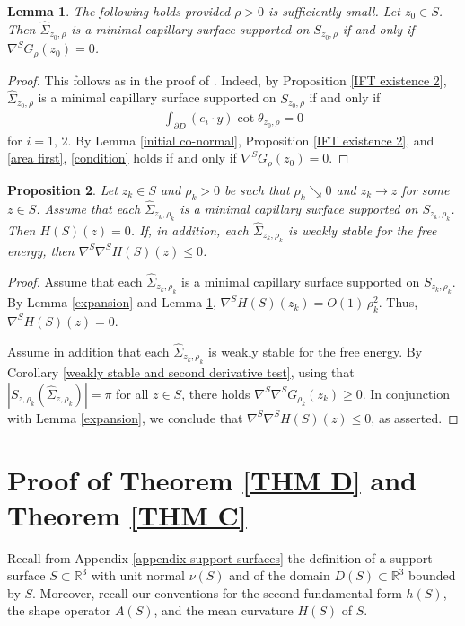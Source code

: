 \documentclass[11pt]{amsart}
\newtheorem{prop}{Proposition}
\newtheorem{lem}[prop]{Lemma}
\begin{document}
\begin{lem} \label{LS reduction}
The following holds provided  $\rho>0$ is sufficiently small. Let $z_0\in S$. Then
	$\hat \Sigma_{z_0,\rho}$ is a minimal capillary surface supported on $S_{z_0,\rho}$ if and only if $\nabla^S G_{\rho}(z_0)=0$. 
\end{lem}
\begin{proof}
This follows as in the proof of \cite[Lemma 19]{cmc}. Indeed,  by Proposition \ref{IFT existence 2}, $\hat \Sigma_{z_0,\rho}$ is a minimal capillary surface supported on $S_{z_0,\rho}$ if and only if
\begin{align} \label{condition}  
\int_{\partial D}(e_i\cdot y)\cot\theta_{z_0,\rho}=0
\end{align} 
for $i=1,\,2$. By Lemma \ref{initial co-normal}, Proposition \ref{IFT existence 2}, and \eqref{area first},  \eqref{condition} holds if and only if $\nabla^SG_\rho(z_0)=0$.

\end{proof}

\begin{prop} \label{mean curvature consequences}
Let $z_k\in S$ and $\rho_k>0$ be such that $\rho_k\searrow 0$ and $z_k\to z$ for some $z\in S$. Assume that each  $\hat \Sigma_{z_k,\rho_k}$ is a minimal capillary surface supported on $S_{z_k,\rho_k}$. Then $H(S)(z)=0$. If, in addition, each $\hat \Sigma_{z_k,\rho_k}$ is weakly stable for the free energy, then $\nabla^{S}\nabla^SH(S)(z)\leq 0$. 
\end{prop}
\begin{proof}
Assume  that each $\hat \Sigma_{z_k,\rho_k}$ is a minimal capillary surface supported on $S_{z_k,\rho_k}$.		By Lemma \ref{expansion} and Lemma \ref{LS reduction},  $\nabla^S H(S)(z_k)=O(1)\,\rho_k^2$. Thus, $\nabla^S H(S)(z)=0$. 
	
Assume in addition that each  $\hat \Sigma_{z_k,\rho_k}$ is weakly stable for the free energy. By Corollary \ref{weakly stable and second derivative test}, using that $|S_{z,\rho_k}(\hat \Sigma_{z,\rho_k})|=\pi$ for all $z\in S$, there holds 
	$
	\nabla^S\nabla^S G_{\rho_k}(z_k)\geq 0.
	$
In conjunction with Lemma \ref{expansion}, we conclude that $\nabla^S\nabla^S H(S)(z)\leq 0$, as asserted.
\end{proof}
 \label{LS2}
\section{Proof of Theorem \ref{THM D} and Theorem \ref{THM C}}
	Recall from Appendix \ref{appendix support surfaces} the definition of a support surface $S\subset \mathbb{R}^3$ with unit normal $\nu(S)$  and of the domain $D(S)\subset \mathbb{R}^3$ bounded by $S$.  Moreover, recall   our conventions for the second fundamental form $h(S)$, the shape operator $A(S)$, and the mean curvature $H(S)$ of $S$. 
\end{document}
